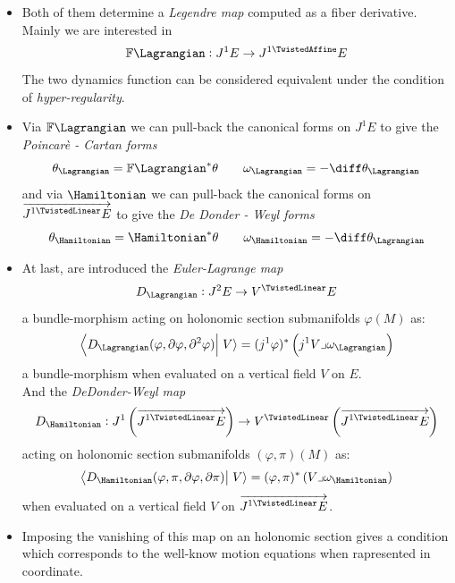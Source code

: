 \documentclass[a4paper,12pt,fleqn]{scrartcl}  %
\renewcommand{\AffDualJet}{ J^{1 \TwistedAffine}E }
\renewcommand{\LinDualJet}{ \overrightarrow{J^{1 \TwistedLinear}E} }
\begin{document}
\begin{itemize}
\item Both of them determine a \emph{Legendre map} computed as a fiber derivative.
	Mainly we are interested  in
	\begin{displaymath}
		\mathbb{F} \Lagrangian : J^1 E \rightarrow \AffDualJet		
	\end{displaymath}
	The two dynamics function can be considered equivalent under the condition of \emph{hyper-regularity}\cite[chapter, p.~215]{Gimmsy}.

\item Via $\mathbb{F} \Lagrangian$ we can pull-back the canonical forms on $J^1 E$ to give the \emph{Poincarè - Cartan forms}
	\begin{displaymath}
		\theta_\Lagrangian = \mathbb{F} \Lagrangian^\ast \theta \qquad \omega_\Lagrangian = - \diff \theta_\Lagrangian
	\end{displaymath}
	and via $\Hamiltonian$ we can pull-back the canonical forms on $\LinDualJet$ to give the \emph{De Donder - Weyl forms}
	\begin{displaymath}
		\theta_\Hamiltonian = \Hamiltonian^\ast \theta \qquad \omega_\Hamiltonian = - \diff \theta_\Lagrangian
	\end{displaymath}
	
\item At last, are introduced the \emph{Euler-Lagrange map}
	\begin{displaymath}
		D_\Lagrangian : J^2 E \rightarrow V^\TwistedLinear E
	\end{displaymath}
	 a bundle-morphism acting on holonomic section submanifolds $\varphi(M)$ as:
	\begin{displaymath}
		\left\langle D_\Lagrangian(\varphi, \partial \varphi , \partial^2 \varphi) \right\vert \left. V \right\rangle = (j^1 \varphi)^\ast \left( j^1V \lrcorner \omega_\Lagrangian \right)
	\end{displaymath}
	 a bundle-morphism when evaluated on a vertical field $V$ on $E$. \\
	And the \emph{DeDonder-Weyl map}
	\begin{displaymath}
		D_\Hamiltonian : J^1\left(\LinDualJet \right) \rightarrow V^\TwistedLinear \left(\LinDualJet \right)
	\end{displaymath}
	acting on holonomic section submanifolds $(\varphi, \pi)(M)$ as:
	\begin{displaymath}
		\left\langle D_\Hamiltonian(\varphi, \pi, \partial \varphi , \partial \pi) \right\vert \left. V \right\rangle = (\varphi, \pi)^\ast \left( V \lrcorner \omega_\Hamiltonian \right)
	\end{displaymath}	
	when evaluated on a vertical field $V$ on $\LinDualJet$.
	
\item	
	Imposing the vanishing of this map on an holonomic section gives a condition which corresponds to the well-know motion equations when rapresented in coordinate.

\end{itemize}
\end{document}
